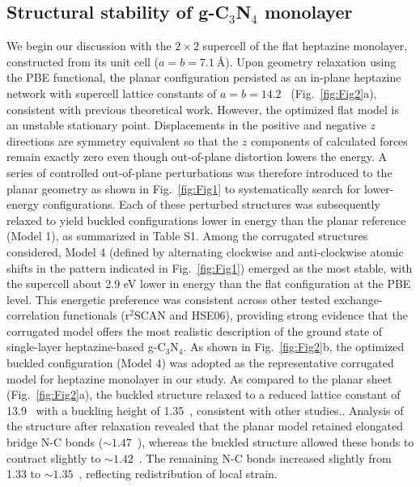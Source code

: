 \subsection{Structural stability of g-C$_3$N$_4$ monolayer}
We begin our discussion with the $2 \times 2$ supercell of the flat heptazine monolayer, constructed from its unit cell ($a=b=7.1~\text{\AA}$). Upon geometry relaxation using the PBE functional, the planar configuration persisted as an in-plane heptazine network with supercell lattice constants of $a = b = 14.2$~\text{\AA} (Fig.\ \ref{fig:Fig2}a), consistent with previous theoretical work.\cite{Gao2017TheStudy,Wu2014TheNitride}
However, the optimized flat model is an unstable stationary point.
Displacements in the positive and negative $z$ directions are symmetry equivalent so that the $z$ components of calculated forces remain exactly zero even though 
out-of-plane distortion lowers the energy.
A series of controlled out-of-plane perturbations was therefore introduced to the planar geometry as shown in Fig.\ \ref{fig:Fig1} to systematically search for lower-energy configurations. Each of these perturbed structures was subsequently relaxed to yield buckled configurations lower in energy than the planar reference (Model 1), as summarized in Table S1. 
Among the corrugated structures considered, Model 4 (defined by alternating clockwise and anti-clockwise atomic shifts in the pattern indicated in Fig.\ \ref{fig:Fig1}) emerged as the most stable, with the supercell about 2.9 eV lower in energy than the flat configuration at the PBE level. This energetic preference was consistent across other tested exchange-correlation functionals (r$^2$SCAN and HSE06), providing strong evidence that the corrugated model offers the most realistic description of the ground state of single-layer heptazine-based g-C$_3$N$_4$. As shown in Fig.\ \ref{fig:Fig2}b, the optimized buckled configuration (Model 4)
was adopted as the representative corrugated model for heptazine monolayer in our study. As compared to the planar sheet (Fig.\ \ref{fig:Fig2}a), the buckled structure relaxed to a reduced lattice constant of 13.9~\text{\AA} with a buckling height of 1.35~\text{\AA}, consistent with other studies.\cite{Gao2020CorrugationStudies,Mridha2025UsingG-C3N4, Liu2020StructuralInvestigation}. 
Analysis of the structure after relaxation revealed that the planar model retained elongated bridge N-C bonds ($\sim1.47$~\text{\AA}), whereas the buckled structure allowed these bonds to contract slightly to $\sim1.42$~\text{\AA}.
The remaining N-C bonds increased slightly from 1.33 to $\sim1.35$~\text{\AA}, reflecting redistribution of local strain. 

